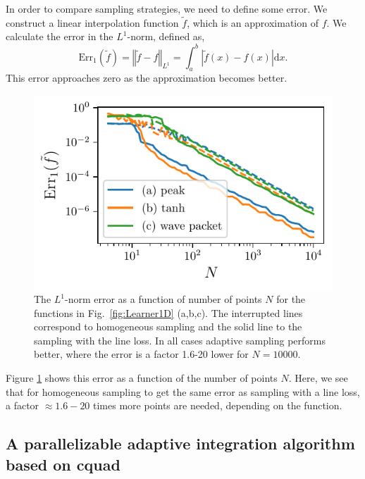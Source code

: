 In order to compare sampling strategies, we need to define some error.
We construct a linear interpolation function $\tilde{f}$, which is an approximation of $f$.
We calculate the error in the $L^{1}$-norm, defined as,
\[
\text{Err}_{1}(\tilde{f})=\left\Vert \tilde{f}-f\right\Vert _{L^{1}}=\int_{a}^{b}\left|\tilde{f}(x)-f(x)\right|\text{d}x.
\]
This error approaches zero as the approximation becomes better.

\begin{figure}
\hypertarget{fig:line_loss_error}{%
\centering
\includegraphics{chapter_adaptive/figures/line_loss_error.pdf}
\caption{The $L^{1}$-norm error as a function of number of points $N$ for the functions in Fig.~\ref{fig:Learner1D} (a,b,c).
The interrupted lines correspond to homogeneous sampling and the solid line to the sampling with the line loss.
In all cases adaptive sampling performs better, where the error is a factor 1.6-20 lower for $N=10000$.}\label{fig:line_loss_error}
}
\end{figure}

Figure \ref{fig:line_loss_error} shows this error as a function of the number of points $N$.
Here, we see that for homogeneous sampling to get the same error as sampling with a line loss, a factor $\approx 1.6-20$ times more points are needed, depending on the function.

\hypertarget{a-parallelizable-adaptive-integration-algorithm-based-on-cquad}{%
\subsection{A parallelizable adaptive integration algorithm based on cquad}\label{a-parallelizable-adaptive-integration-algorithm-based-on-cquad}}

